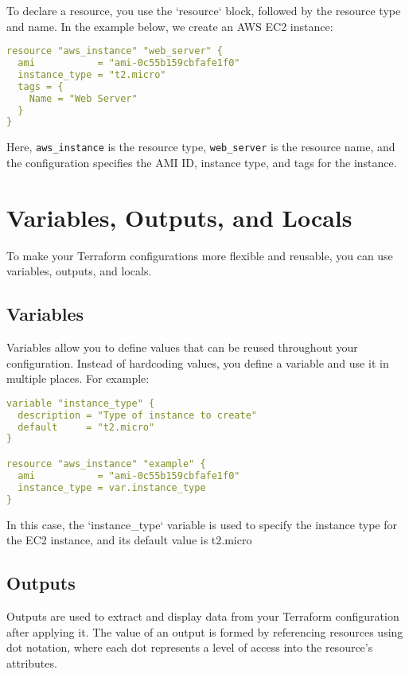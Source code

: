To declare a resource, you use the `resource` block, followed by the resource type and name. In the example below, we create an AWS EC2 instance:

\begin{lstlisting}[language=yaml]
resource "aws_instance" "web_server" {
  ami           = "ami-0c55b159cbfafe1f0"
  instance_type = "t2.micro"
  tags = {
    Name = "Web Server"
  }
}
\end{lstlisting}

Here, \texttt{aws\_instance} is the resource type, \texttt{web\_server} is the resource name, and the configuration specifies the AMI ID, instance type, and tags for the instance.

\section{Variables, Outputs, and Locals}

To make your Terraform configurations more flexible and reusable, you can use variables, outputs, and locals.

\subsection{Variables}

Variables allow you to define values that can be reused throughout your configuration. Instead of hardcoding values, you define a variable and use it in multiple places. For example:

\begin{lstlisting}[language=yaml]
variable "instance_type" {
  description = "Type of instance to create"
  default     = "t2.micro"
}

resource "aws_instance" "example" {
  ami           = "ami-0c55b159cbfafe1f0"
  instance_type = var.instance_type
}
\end{lstlisting}

In this case, the `instance\_type` variable is used to specify the instance type for the EC2 instance, and its default value is t2.micro

\subsection{Outputs}

Outputs are used to extract and display data from your Terraform configuration after applying it. The value of an output is formed by referencing resources using dot notation, where each dot represents a level of access into the resource's attributes.

